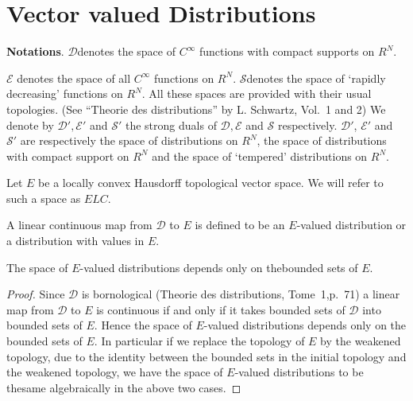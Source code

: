 


\chapter{Vector valued Distributions}\label{chap1}



{\bf Notations}. $\mathscr{D}$\pageoriginale denotes the space of $C^\infty$
functions with compact supports on $R^N$. 

$\mathscr{E}$ denotes the space of all $C^\infty$ functions on
$R^N$. $\mathscr{S}$denotes the space of `rapidly decreasing'
functions on $R^N$. All these spaces are provided with their usual
topologies. (See ``Theorie des distributions'' by L. Schwartz, Vol.\ 1
and 2) We denote by $\mathscr{D}', \mathscr{E}'$ and $\mathscr{S}'$
the strong duals of $\mathscr{D},\mathscr{E}$ and $\mathscr{S}$
respectively. $\mathscr{D}'$, $\mathscr{E}'$ and $\mathscr{S}'$ are
respectively the space of distributions on $R^N$, the space of
distributions with compact support on $R^N$ and the space of
`tempered' distributions on $R^N$.

\medskip
{}

Let $E$ be a locally convex Hausdorff topological vector space. We
will refer to such a space as $ELC$.

\setcounter{section}{1}
\begin{definition}\label{chap1:def1.1} 
A linear continuous map from $\mathscr{D}$ to $E$ is defined to be an
$E$-valued distribution or a distribution with values in $E$.
\end{definition}

\begin{remark*}
The space of $E$-valued distributions depends only on the\break bounded sets
of $E$.
\end{remark*}

\begin{proof}
Since $\mathscr{D}$ is bornological (Theorie des distributions, 
Tome~1,\break p.~71) a linear map from $\mathscr{D}$ to $E$ is continuous if and
only if it takes bounded sets of $\mathscr{D}$ into bounded sets of
$E$. Hence the space of $E$-valued distributions depends only on the
bounded sets of $E$. In particular if we replace the topology of $E$
by the weakened topology, due to the identity between the bounded sets
in the initial topology and the weakened topology, we have the space
of $E$-valued distributions to be the\pageoriginale same algebraically in the above
two cases.
\end{proof}

